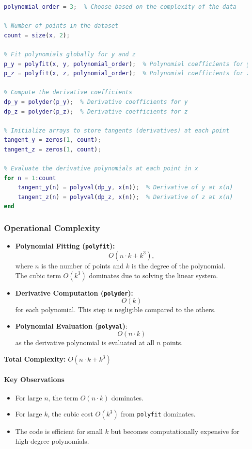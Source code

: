 \documentclass[a4paper]{article}
\begin{document}
\begin{lstlisting}[language=matlab]
% Degree of the polynomial fit
polynomial_order = 3;  % Choose based on the complexity of the data

% Number of points in the dataset
count = size(x, 2);

% Fit polynomials globally for y and z
p_y = polyfit(x, y, polynomial_order);  % Polynomial coefficients for y
p_z = polyfit(x, z, polynomial_order);  % Polynomial coefficients for z

% Compute the derivative coefficients
dp_y = polyder(p_y);  % Derivative coefficients for y
dp_z = polyder(p_z);  % Derivative coefficients for z

% Initialize arrays to store tangents (derivatives) at each point
tangent_y = zeros(1, count);
tangent_z = zeros(1, count);

% Evaluate the derivative polynomials at each point in x
for n = 1:count
    tangent_y(n) = polyval(dp_y, x(n));  % Derivative of y at x(n)
    tangent_z(n) = polyval(dp_z, x(n));  % Derivative of z at x(n)
end
\end{lstlisting}

\subsubsection*{Operational Complexity}
\begin{itemize}
    \item \textbf{Polynomial Fitting (\texttt{polyfit}):} 
    \[O(n \cdot k + k^3),\]
     where \( n \) is the number of points and \( k \) is the degree of the polynomial.\\
    The cubic term \( O(k^3) \) dominates due to solving the linear system.

    \item \textbf{Derivative Computation (\texttt{polyder}):}
    \[O(k)\] for each polynomial.
    This step is negligible compared to the others.

    \item \textbf{Polynomial Evaluation (\texttt{polyval})}:
    \[O(n \cdot k)\]
    as the derivative polynomial is evaluated at all \( n \) points.
\end{itemize}

\textbf{Total Complexity:} \(O(n \cdot k + k^3)\)

\paragraph*{Key Observations}
\begin{itemize}
    \item For large \( n \), the term \( O(n \cdot k) \) dominates.
    \item For large \( k \), the cubic cost \( O(k^3) \) from \texttt{polyfit} dominates.
    \item The code is efficient for small \( k \) but becomes computationally expensive for high-degree polynomials.
\end{itemize}
\end{document}

